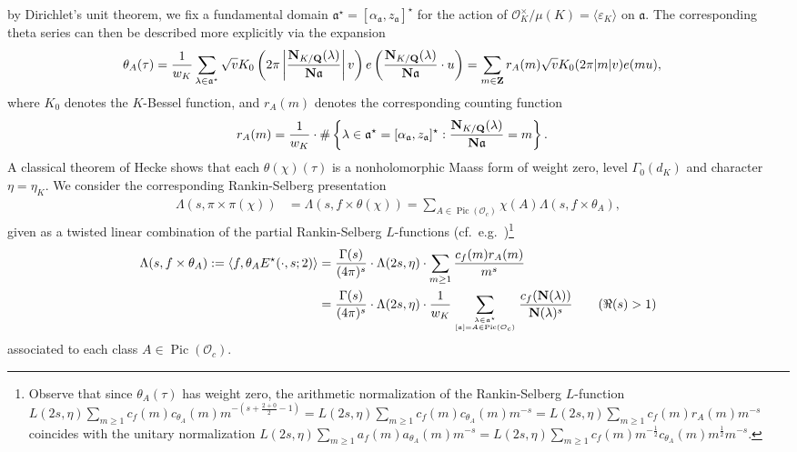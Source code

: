 \documentclass{amsart}
\theoremstyle{definition}
\begin{document}
by Dirichlet's unit theorem, we fix a fundamental domain $\mathfrak{a}^{\star} = [\alpha_{\mathfrak{a}}, z_{\mathfrak{a}}]^{\star}$ for the
action of $\mathcal{O}_K^{\times} / \mu(K) = \langle \varepsilon_K \rangle$ on $\mathfrak{a}$. The corresponding theta
series can then be described more explicitly via the expansion 
\begin{align*} \theta_A(\tau) &= \frac{1}{w_K} \sum\limits_{ \lambda \in \mathfrak{a}^{\star} } 
\sqrt{v} K_0 \left( 2 \pi \left\vert  \frac{ {\bf{N}}_{K/{\bf{Q}}}(\lambda) }{  {\bf{N}} \mathfrak{a} }  \right\vert v \right)
e \left(  \frac{ {\bf{N}}_{K/{\bf{Q}}}(\lambda) }{  {\bf{N}} \mathfrak{a} } \cdot u  \right) 
=  \sum\limits_{m \in {\bf{Z}}} r_A(m) \sqrt{v} K_0(2 \pi \vert m \vert v) e(m u),\end{align*}  
where $K_0$ denotes the $K$-Bessel function, and $r_A(m)$ denotes the corresponding counting function 
\begin{align*} r_A(m) &= \frac{1}{w_K} \cdot \# \left\lbrace \lambda \in \mathfrak{a}^{\star} = [\alpha_{\mathfrak{a}} ,z_{\mathfrak{a}}]^{\star}: 
\frac{ {\bf{N}}_{K/{\bf{Q}}}(\lambda) }{  {\bf{N}} \mathfrak{a} } =m \right\rbrace. \end{align*}
A classical theorem of Hecke shows that each $\theta(\chi)(\tau)$ is a nonholomorphic Maass form of weight zero, 
level $\Gamma_0(d_K)$ and character $\eta = \eta_K$. We consider the corresponding Rankin-Selberg presentation 
\begin{align*} \Lambda(s, \pi \times \pi(\chi)) 
&= \Lambda(s, f \times \theta(\chi)) = \sum\limits_{A \in \operatorname{Pic}(\mathcal{O}_c)} \chi(A) \Lambda(s, f \times \theta_A), \end{align*}
given as a twisted linear combination of the partial Rankin-Selberg $L$-functions 
(cf.~e.g.~\cite[$\S$ IV (0.1)]{GZ})\footnote{Observe that since $\theta_A(\tau)$ has weight zero, the arithmetic normalization
of the Rankin-Selberg $L$-function $L(2s, \eta) \sum_{m \geq 1} c_f(m) c_{\theta_A}(m) m^{- \left( s + \frac{2+0}{2} - 1 \right)}
= L(2s, \eta) \sum_{m \geq 1} c_f(m) c_{\theta_A}(m) m^{-s} = L(2s, \eta) \sum_{m \geq 1} c_f(m) r_A(m) m^{-s}$ 
coincides with the unitary normalization $L(2s, \eta) \sum_{m \geq 1} a_f(m) a_{\theta_A}(m) m^{-s} 
= L(2s, \eta) \sum_{m \geq 1}  c_f(m)m^{-\frac{1}{2}} c_{\theta_A}(m) m^{\frac{1}{2}} m^{-s}$.} 
\begin{equation}\begin{aligned}\label{classRS} \Lambda(s, f \times \theta_A) := \langle f, \theta_A E^{\star}(\cdot, s; 2) \rangle 
&= \frac{\Gamma(s)}{(4 \pi)^{s}} \cdot \Lambda(2s, \eta) \cdot \sum\limits_{m \geq 1} \frac{ c_f(m) r_A(m)}{ m^s}  \\
&=  \frac{\Gamma(s)}{(4 \pi)^{s}} \cdot \Lambda(2s, \eta) 
\cdot \frac{1}{w_K}\sum\limits_{ \lambda \in \mathfrak{a}^{\star} \atop [\mathfrak{a}] = A \in \operatorname{Pic}(\mathcal{O}_c) }
\frac{ c_f( {\bf{N}}(\lambda))}{ {\bf{N}}(\lambda)^{s}} \quad \quad (\Re(s) >1) \end{aligned}\end{equation}
associated to each class $A \in \operatorname{Pic}(\mathcal{O}_c)$.
\end{document}
